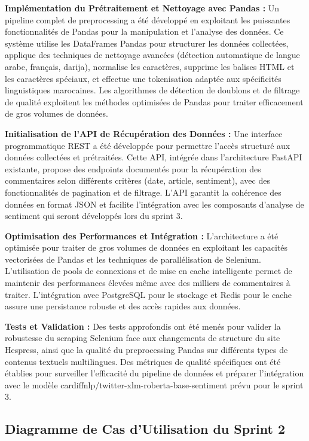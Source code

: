 \textbf{Implémentation du Prétraitement et Nettoyage avec Pandas :} Un pipeline complet de preprocessing a été développé en exploitant les puissantes fonctionnalités de Pandas pour la manipulation et l'analyse des données. Ce système utilise les DataFrames Pandas pour structurer les données collectées, applique des techniques de nettoyage avancées (détection automatique de langue arabe, français, darija), normalise les caractères, supprime les balises HTML et les caractères spéciaux, et effectue une tokenisation adaptée aux spécificités linguistiques marocaines. Les algorithmes de détection de doublons et de filtrage de qualité exploitent les méthodes optimisées de Pandas pour traiter efficacement de gros volumes de données.

\textbf{Initialisation de l'API de Récupération des Données :} Une interface programmatique REST a été développée pour permettre l'accès structuré aux données collectées et prétraitées. Cette API, intégrée dans l'architecture FastAPI existante, propose des endpoints documentés pour la récupération des commentaires selon différents critères (date, article, sentiment), avec des fonctionnalités de pagination et de filtrage. L'API garantit la cohérence des données en format JSON et facilite l'intégration avec les composants d'analyse de sentiment qui seront développés lors du sprint 3.

\textbf{Optimisation des Performances et Intégration :} L'architecture a été optimisée pour traiter de gros volumes de données en exploitant les capacités vectorisées de Pandas et les techniques de parallélisation de Selenium. L'utilisation de pools de connexions et de mise en cache intelligente permet de maintenir des performances élevées même avec des milliers de commentaires à traiter. L'intégration avec PostgreSQL pour le stockage et Redis pour le cache assure une persistance robuste et des accès rapides aux données.

\textbf{Tests et Validation :} Des tests approfondis ont été menés pour valider la robustesse du scraping Selenium face aux changements de structure du site Hespress, ainsi que la qualité du preprocessing Pandas sur différents types de contenus textuels multilingues. Des métriques de qualité spécifiques ont été établies pour surveiller l'efficacité du pipeline de données et préparer l'intégration avec le modèle cardiffnlp/twitter-xlm-roberta-base-sentiment prévu pour le sprint 3.

\subsection{Diagramme de Cas d'Utilisation du Sprint 2}

